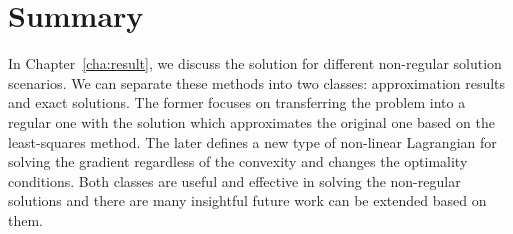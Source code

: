 \section{Summary}
In Chapter~\ref{cha:result}, we discuss the solution for different non-regular solution scenarios. We can separate these methods into two classes: approximation results and exact solutions. The former focuses on transferring the problem into a regular one with the solution which approximates the original one based on the least-squares method. The later defines a new type of non-linear Lagrangian for solving the gradient regardless of the convexity and changes the optimality conditions. Both classes are useful and effective in solving the non-regular solutions and there are many insightful future work can be extended based on them. 
